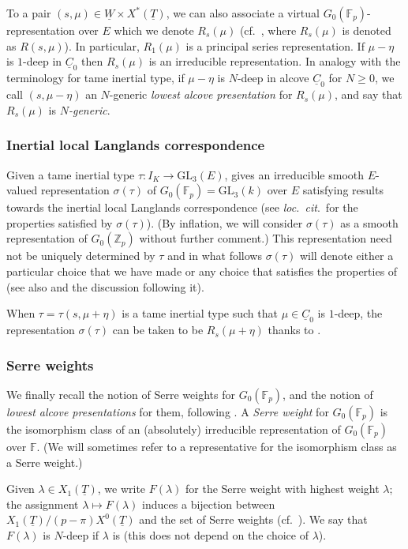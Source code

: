 \documentclass[oneside,a4paper,english, 11pt]{amsart}
\theoremstyle{plain}
\theoremstyle{plain}
\theoremstyle{plain}
\theoremstyle{plain}
\theoremstyle{plain}
\theoremstyle{plain}
\theoremstyle{definition}
\theoremstyle{definition}
\theoremstyle{definition}
\theoremstyle{remark}
\numberwithin{equation}{section}
\newcommand{\F}{\mathbb{F}}
\newcommand{\Zp}{\mathbb{Z}_p}
\newcommand{\GL}{\mathrm{GL}}
\newcommand{\Fp}{\F_p}
\newcommand{\un}[1]{\underline{#1}}
\newcommand{\ra}{\rightarrow}
\begin{document}
To a pair $(s,\mu)\in \un{W}\times X^*(\un{T})$, we can also associate a virtual $G_0(\Fp)$-representation over $E$ which we denote $R_s(\mu)$ (cf.~\cite[Definition 9.2.2]{GHS}, where $R_s(\mu)$ is denoted as $R(s,\mu)$).
In particular, $R_1(\mu)$ is a principal series representation.
If $\mu-\eta$ is $1$-deep in $\un{C}_0$ then $R_s(\mu)$ is an irreducible representation.
%
In analogy with the terminology for tame inertial type, if $\mu-\eta$ is $N$-deep in alcove $\un{C}_0$ for $N\geq 0$, we call $(s,\mu-\eta)$ an $N$-generic \emph{lowest alcove presentation} for $R_s(\mu)$, and say that $R_s(\mu)$ is \emph{$N$-generic}. 
%
%
%

\subsubsection{Inertial local Langlands correspondence}
\label{subsub:ILLC}
Given a tame inertial type $\tau: I_{K}\ra \GL_3(E)$, \cite[Theorem 3.7]{CEGGPS} gives an irreducible smooth $E$-valued representation $\sigma(\tau)$ of $G_0(\Fp)= \GL_3(k)$ over $E$ satisfying results towards the inertial local Langlands correspondence (see \emph{loc.~cit}.~for the properties satisfied by $\sigma(\tau)$).
(By inflation, we will consider $\sigma(\tau)$ as a smooth representation of $G_0(\Zp)$ without further comment.)
This representation need not be uniquely determined by $\tau$ and in what follows $\sigma(\tau)$ will denote either a particular choice that we have made or any choice that satisfies the properties of \cite[Theorem 3.7]{CEGGPS} (see also \cite[Theorem 2.5.3]{MLM} and the discussion following it).


When $\tau=\tau(s,\mu+\eta)$ is a tame inertial type such that $\mu\in \un{C}_0$ is $1$-deep, the representation $\sigma(\tau)$ can be taken to be $R_s(\mu+\eta)$ thanks to \cite[Corollary 2.3.5]{LLL}.
%
\subsubsection{Serre weights}
\label{subsubsec:SW}
We finally recall the notion of Serre weights for $G_0(\Fp)$, and the notion of \emph{lowest alcove presentations} for them, following \cite[\S 2.2]{MLM}.
A \emph{Serre weight} for $G_0(\Fp)$ is the isomorphism class of an (absolutely) irreducible representation of $G_0(\Fp)$ over $\F$. 
(We will sometimes refer to a representative for the isomorphism class as a Serre weight.)

Given $\lambda\in X_1(\un{T})$, we write $F(\lambda)$ for the Serre weight with highest weight $\lambda$; the assignment $\lambda\mapsto F(\lambda)$ induces a bijection between $X_1(\un{T})/(p-\pi)X^0(\un{T})$ and the set of Serre weights (cf.~\cite[Lemma 9.2.4]{GHS}). We say that $F(\lambda)$ is $N$-deep if $\lambda$ is (this does not depend on the choice of $\lambda$).
\end{document}
